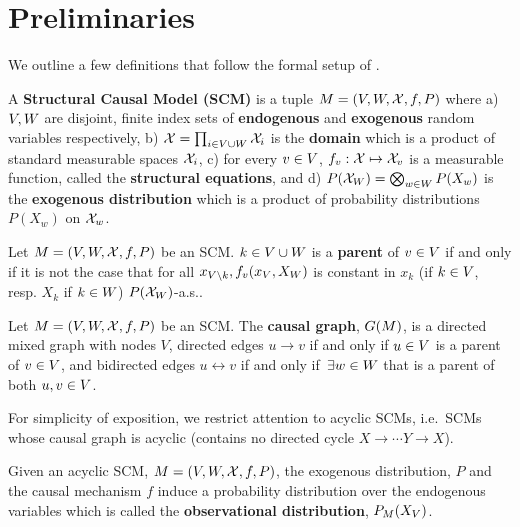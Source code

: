 \section{Preliminaries} \label{sec:prelim}
We outline a few definitions that follow the formal setup of \cite{BongersFPM21}.
\begin{definition}
A \textbf{Structural Causal Model (SCM)} is a tuple $M = {\left({V,W,\mathcal{X},f,P}\right)}$ where a) $V,W$ are disjoint, finite index sets of \textbf{endogenous} and \textbf{exogenous} random variables respectively, b) $\mathcal{X} = \prod_{i \in V \cup W} \mathcal{X}_i $ is the \textbf{domain} which is a product of standard measurable spaces $\mathcal{X}_i$, c) for every $v \in V$, $f_v:\mathcal{X} \mapsto \mathcal{X}_{v}$ is a measurable function, called the \textbf{structural equations}, and d) $P{\left({\mathcal{X}_{W}}\right)} = \bigotimes_{w \in W} P(X_w)$ is the \textbf{exogenous distribution} which is a product of probability distributions $P(X_w)$ on $\mathcal{X}_{w}$.  
\end{definition}

\begin{definition}[Parent]
Let $M = {\left({V,W,\mathcal{X},f,P}\right)}$ be an SCM. $k \in V \cup W$ is a \textbf{parent} of $v \in V$ if and only if it is not the case that for all $x_{V \backslash k}, f_v(x_V,X_W)$ is constant in $x_k$ (if $k \in V$, resp. $X_k$ if $k \in W$)  $P(\mathcal{X}_{W})$-a.s..
\end{definition}


\begin{definition}
             Let $M = {\left({V, W, \mathcal{X}, f,P}\right)}$ be an SCM. The \textbf{causal graph}, $G{\left({M}\right)}$, is a directed mixed graph with nodes $V$, directed edges $u \longrightarrow v$ if and only if $u \in V$ is a parent of $v \in V$, and bidirected edges $u \leftrightarrow v$ if and only if $ \,\exists w \in W$ that is a parent of both $u,v \in V$. 
\end{definition}
For simplicity of exposition, we restrict attention to acyclic SCMs, i.e.\ SCMs whose causal graph is acyclic (contains no directed cycle $X \rightarrow \cdots Y \rightarrow X$).
\begin{definition}
Given an acyclic SCM, $M= {\left({V,W,\mathcal{X},f,P}\right)}$, the exogenous distribution, $P$ and the causal mechanism $f$ induce a probability distribution over the endogenous variables which is called the \textbf{observational distribution}, $P_{M}(X_{V})$.
\end{definition}

